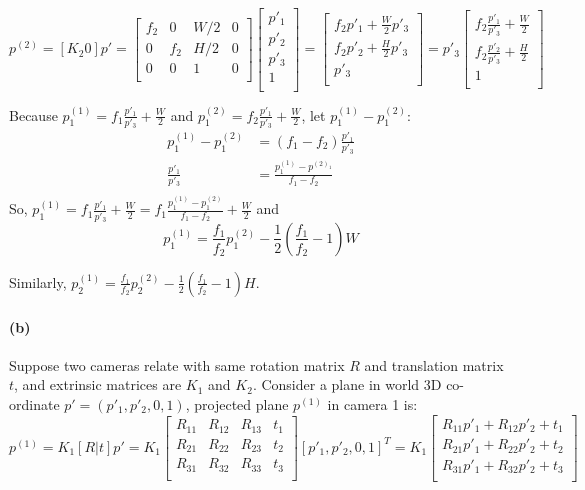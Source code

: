 \documentclass{article}
\newcommand{\spart}[1]{\paragraph{(#1)}}
\begin{document}
$$
  p^{(2)} = [K_2 0]p' = \begin{bmatrix}
    f_2 & 0 & W/2 & 0 \\
    0 & f_2 & H/2 & 0 \\
    0 & 0 & 1 & 0 \\
  \end{bmatrix}\begin{bmatrix}
    p'_1 \\
    p'_2 \\
    p'_3 \\
    1 \\
  \end{bmatrix} = \begin{bmatrix}
    f_2p'_1 + \frac{W}{2}p'_3 \\
    f_2p'_2 + \frac{H}{2}p'_3 \\
    p'_3 \\
  \end{bmatrix} = p'_3\begin{bmatrix}
    f_2\frac{p'_1}{p'_3} + \frac{W}{2} \\
    f_2\frac{p'_2}{p'_3} + \frac{H}{2} \\
    1 \\
  \end{bmatrix} 
$$

Because $p^{(1)}_1 = f_1\frac{p'_1}{p'_3} + \frac{W}{2}$ and $p^{(2)}_1 = f_2\frac{p'_1}{p'_3} + \frac{W}{2}$,
let $p^{(1)}_1 - p^{(2)}_1$:
$$
\begin{aligned}
  p^{(1)}_1 - p^{(2)}_1 & = (f_1 - f_2)\frac{p'_1}{p'_3} \\
  \frac{p'_1}{p'_3} & = \frac{p^{(1)}_1 - p^{(2)_1}}{f_1 - f_2} \\
\end{aligned}
$$
So, $p^{(1)}_1 = f_1\frac{p'_1}{p'_3} + \frac{W}{2} = f_1\frac{p^{(1)}_1 - p^{(2)}_1}{f_1 - f_2} + \frac{W}{2}$ and 
$$
  p^{(1)}_1 =  \frac{f_1}{f_2} p^{(2)}_1 - \frac{1}{2}(\frac{f_1}{f_2}-1)W
$$

Similarly, $p^{(1)}_2 =  \frac{f_1}{f_2} p^{(2)}_2 - \frac{1}{2}(\frac{f_1}{f_2}-1)H$.

\spart{b}
Suppose two cameras relate with same rotation matrix $R$ and translation matrix $t$, and extrinsic matrices are $K_1$ and $K_2$. 
Consider a plane in world 3D co-ordinate $p' = (p'_1, p'_2, 0, 1)$, projected plane $p^{(1)}$ in camera 1 is:
$$
  p^{(1)} = K_1 [R|t] p' = K_1 \begin{bmatrix}
    R_{11} & R_{12} & R_{13} & t_1 \\
    R_{21} & R_{22} & R_{23} & t_2 \\
    R_{31} & R_{32} & R_{33} & t_3 \\
  \end{bmatrix} {[p'_1, p'_2, 0, 1]}^T = K_1 \begin{bmatrix}
    R_{11}p'_1 + R_{12}p'_2 + t_1 \\
    R_{21}p'_1 + R_{22}p'_2 + t_2 \\
    R_{31}p'_1 + R_{32}p'_2 + t_3 \\
  \end{bmatrix}
$$
\end{document}
